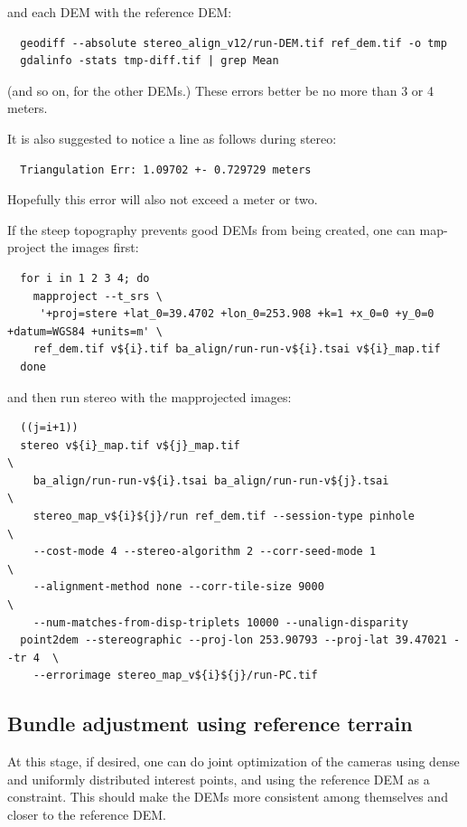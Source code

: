 and each DEM with the reference DEM:
\begin{verbatim}
  geodiff --absolute stereo_align_v12/run-DEM.tif ref_dem.tif -o tmp 
  gdalinfo -stats tmp-diff.tif | grep Mean
\end{verbatim}

(and so on, for the other DEMs.) These errors better be no more than 3 or 4 meters.

It is also suggested to notice a line as follows during stereo:
\begin{verbatim}
  Triangulation Err: 1.09702 +- 0.729729 meters
\end{verbatim}

Hopefully this error will also not exceed a meter or two. 

If the steep topography prevents good DEMs from being created, one can 
map-project the images first:

\begin{verbatim}
  for i in 1 2 3 4; do 
    mapproject --t_srs \
     '+proj=stere +lat_0=39.4702 +lon_0=253.908 +k=1 +x_0=0 +y_0=0 +datum=WGS84 +units=m' \
    ref_dem.tif v${i}.tif ba_align/run-run-v${i}.tsai v${i}_map.tif  
  done
\end{verbatim} %

and then run stereo with the mapprojected images:

\begin{verbatim}
  ((j=i+1))
  stereo v${i}_map.tif v${j}_map.tif                                         \
    ba_align/run-run-v${i}.tsai ba_align/run-run-v${j}.tsai                  \
    stereo_map_v${i}${j}/run ref_dem.tif --session-type pinhole              \
    --cost-mode 4 --stereo-algorithm 2 --corr-seed-mode 1                    \
    --alignment-method none --corr-tile-size 9000                            \
    --num-matches-from-disp-triplets 10000 --unalign-disparity
  point2dem --stereographic --proj-lon 253.90793 --proj-lat 39.47021 --tr 4  \
    --errorimage stereo_map_v${i}${j}/run-PC.tif
\end{verbatim}

\subsection{Bundle adjustment using reference terrain}

At this stage, if desired, one can do joint optimization of the cameras using dense
and uniformly distributed interest points, and using the reference DEM as a constraint.
This should make the DEMs more consistent among themselves and closer to the reference DEM.

